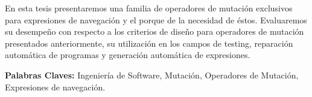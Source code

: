 
En esta tesis presentaremos una familia de operadores de mutaci\'on exclusivos para expresiones de navegaci\'on y el porque de la necesidad de \'estos. Evaluaremos su desempe\~no con respecto a los criterios de dise\~no para operadores de mutaci\'on presentados anteriormente, su utilizaci\'on en los campos de testing, reparaci\'on autom\'atica de programas y generaci\'on autom\'atica de expresiones.

\noindent
\textbf{Palabras Claves:} Ingenier\'ia de Software, Mutaci\'on, Operadores de Mutaci\'on, Expresiones de navegaci\'on.\\








